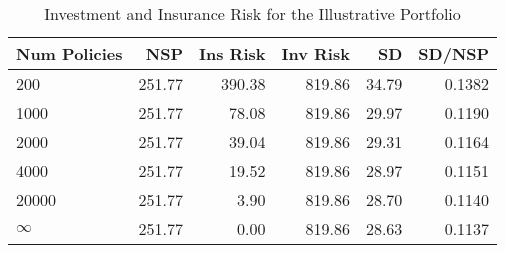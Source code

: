 \begin{table}[!htpb]
\centering
\begingroup\small
\begin{tabular}{lrrrrr}
  \hline
Num Policies & NSP & Ins Risk & Inv Risk & SD & SD/NSP \\ 
  \hline
200 & 251.77 & 390.38 & 819.86 & 34.79 & 0.1382 \\ 
  1000 & 251.77 & 78.08 & 819.86 & 29.97 & 0.1190 \\ 
  2000 & 251.77 & 39.04 & 819.86 & 29.31 & 0.1164 \\ 
  4000 & 251.77 & 19.52 & 819.86 & 28.97 & 0.1151 \\ 
  20000 & 251.77 & 3.90 & 819.86 & 28.70 & 0.1140 \\ 
  $\infty$ & 251.77 & 0.00 & 819.86 & 28.63 & 0.1137 \\ 
   \hline
\end{tabular}
\endgroup
\caption{Investment and Insurance Risk for the Illustrative Portfolio} 
\label{tab:risktable1991}
\end{table}


